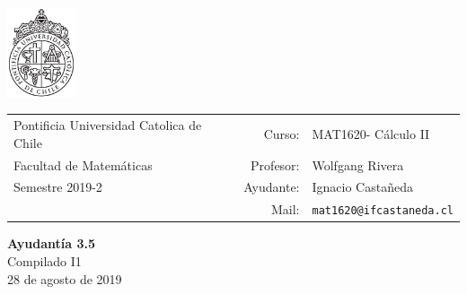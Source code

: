 \documentclass[12pt]{article}
\makeatletter
\newcommand{\ayudantia}{{\sc Ayudantía 3.5}}
\newcommand{\tituloayu}{Compilado I1}
\newcommand{\fecha}{28 de agosto de 2019}
\newcommand{\sigla}{MAT1620}
\newcommand{\nombre}{Cálculo II}
\newcommand{\profesor}{Wolfgang Rivera}
\newcommand{\ano}{2019}
\newcommand{\semestre}{2}
\newcommand{\mail}{mat1620@ifcastaneda.cl}
\makeatother
\begin{document}
\thispagestyle{empty}

\begin{minipage}{2cm}
	\includegraphics[width=2cm]{../../../../img/logo.pdf}
	\vspace{0.5cm}
\end{minipage}
\begin{minipage}{\linewidth}
	\begin{tabular}{lrl}
		{\scriptsize\sc Pontificia Universidad Catolica de Chile} & \hspace*{0.7in}Curso: &
		\sigla  - \nombre\\
		{\sc Facultad de Matemáticas}&
		Profesor: & \profesor \\
		{\sc Semestre \ano-\semestre} & Ayudante: & {Ignacio Castañeda}\\
		& {Mail:} & \texttt{\mail}
	\end{tabular}
\end{minipage}

\vspace{-10mm}
\begin{center}
	{\LARGE\bf \ayudantia}\\
	\vspace{0.1cm}
	{\tituloayu}\\
	\vspace{0.1cm}
	\fecha\\
	\vspace{0.4cm}
\end{center}
\end{document}
